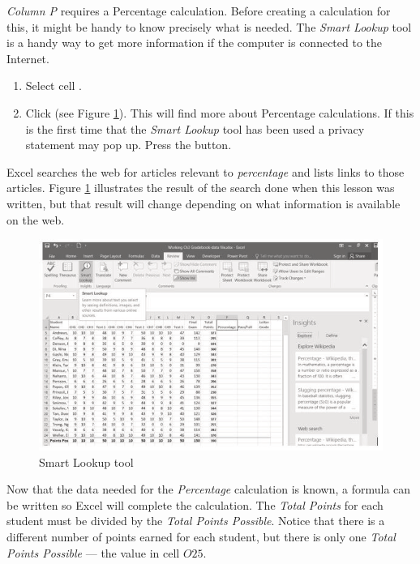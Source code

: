 \textit{Column P} requires a Percentage calculation. Before creating a calculation for this, it might be handy to know precisely what is needed. The \textit{Smart Lookup} tool is a handy way to get more information if the computer is connected to the Internet.

\begin{enumbox}
	\begin{enumerate}
		\item Select cell .
		\item Click  (see Figure \ref{03:fig06}). This will find more about Percentage calculations. If this is the first time that the \textit{Smart Lookup} tool has been used a privacy statement may pop up. Press the  button.
	\end{enumerate}
\end{enumbox}
	
Excel searches the web for articles relevant to \textit{percentage} and lists links to those articles. Figure \ref{03:fig06} illustrates the result of the search done when this lesson was written, but that result will change depending on what information is available on the web.

\begin{figure}[H]
	\centering
	\includegraphics[width=\maxwidth{.95\linewidth}]{gfx/ch03_fig06}
	\caption{Smart Lookup tool}
	\label{03:fig06}
\end{figure}

Now that the data needed for the \textit{Percentage} calculation is known, a formula can be written so Excel will complete the calculation. The \textit{Total Points} for each student must be divided by the \textit{Total Points Possible}. Notice that there is a different number of points earned for each student, but there is only one \textit{Total Points Possible} --- the value in cell $ O25 $.

